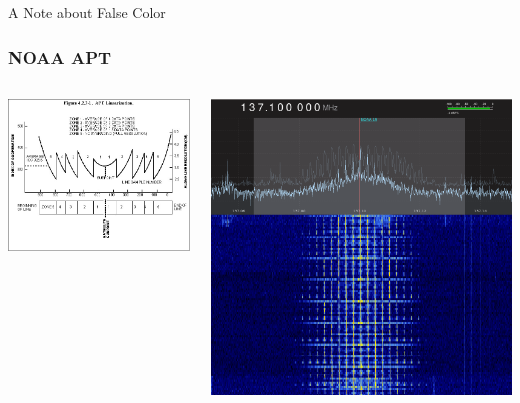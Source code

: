 \documentclass[]{beamer}
\begin{document}
\begin{frame}[c]
    \centering
    \huge A Note about False Color
\end{frame}
\begin{frame}
    \frametitle{NOAA APT}
    \begin{columns}[T]
        \begin{column}[T]{5cm}
            \includegraphics[width=0.45\paperwidth]{images/apt-freq.jpg}
        \end{column}
        \begin{column}[T]{5cm}
            \includegraphics[height=0.45\paperwidth]{images/apt-gqrx.png}
        \end{column}
    \end{columns}
    \begin{center}
    \end{center}
\end{frame}
\end{document}
